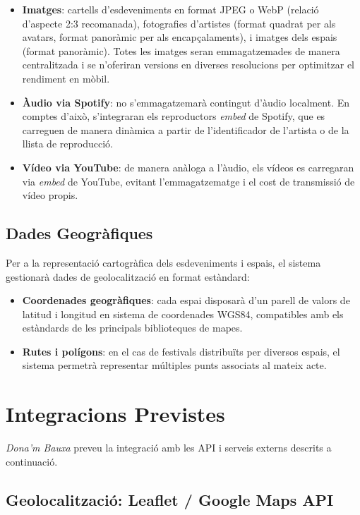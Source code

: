 \begin{itemize}
    \item \textbf{Imatges}: cartells d'esdeveniments en format JPEG o WebP (relació d'aspecte 2:3 recomanada), fotografies d'artistes (format quadrat per als avatars, format panoràmic per als encapçalaments), i imatges dels espais (format panoràmic). Totes les imatges seran emmagatzemades de manera centralitzada i se n'oferiran versions en diverses resolucions per optimitzar el rendiment en mòbil.
    \item \textbf{Àudio via Spotify}: no s'emmagatzemarà contingut d'àudio localment. En comptes d'això, s'integraran els reproductors \textit{embed} de Spotify, que es carreguen de manera dinàmica a partir de l'identificador de l'artista o de la llista de reproducció.
    \item \textbf{Vídeo via YouTube}: de manera anàloga a l'àudio, els vídeos es carregaran via \textit{embed} de YouTube, evitant l'emmagatzematge i el cost de transmissió de vídeo propis.
\end{itemize}

\subsection{Dades Geogràfiques}

Per a la representació cartogràfica dels esdeveniments i espais, el sistema gestionarà dades de geolocalització en format estàndard:

\begin{itemize}
    \item \textbf{Coordenades geogràfiques}: cada espai disposarà d'un parell de valors de latitud i longitud en sistema de coordenades WGS84, compatibles amb els estàndards de les principals biblioteques de mapes.
    \item \textbf{Rutes i polígons}: en el cas de festivals distribuïts per diversos espais, el sistema permetrà representar múltiples punts associats al mateix acte.
\end{itemize}

\section{Integracions Previstes}

\textit{Dona'm Bauxa} preveu la integració amb les API i serveis externs descrits a continuació.

\subsection{Geolocalització: Leaflet / Google Maps API}

